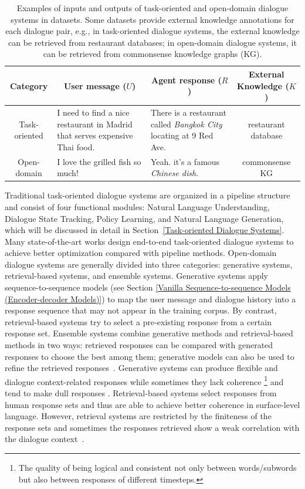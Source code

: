 \begin{table}[h]
\caption{Examples of inputs and outputs of task-oriented and open-domain dialogue systems in datasets. Some datasets provide external knowledge annotations for each dialogue pair, e.g., in task-oriented dialogue systems, the external knowledge can be retrieved from restaurant databases; in open-domain dialogue systems, it can be retrieved from commonsense knowledge graphs (KG).}
\label{An example of inputs and outputs of task-oriented and open-domain dialogue systems in datasets} 
\centering
\begin{tabular}{m{2cm}m{3cm}m{3cm}m{3.7cm}}
\bottomrule
\multicolumn{1}{c}{\textbf{Category}} & \multicolumn{1}{c}{\textbf{User message ($U$)}} & \multicolumn{1}{c}{\textbf{Agent response ($R$)}} & \multicolumn{1}{c}{\textbf{External Knowledge ($K$)}}\\\midrule
\multicolumn{1}{c}{Task-oriented} & I need to find a nice restaurant in Madrid that serves expensive Thai food. & There is a restaurant called \textit{Bangkok City} locating at 9 Red Ave. & \multicolumn{1}{c}{restaurant database} \\\hline
\multicolumn{1}{c}{Open-domain} & I love the grilled fish so much! & Yeah. it's a famous \textit{Chinese dish}. & \multicolumn{1}{c}{commonsense KG} \\
\bottomrule
\end{tabular}
\end{table}
Traditional task-oriented dialogue systems are organized in a pipeline structure and consist of four functional modules: Natural Language Understanding, Dialogue State Tracking, Policy Learning, and Natural Language Generation, which will be discussed in detail in Section~\ref{Task-oriented Dialogue Systems}. Many state-of-the-art works design end-to-end task-oriented dialogue systems to achieve better optimization compared with pipeline methods. Open-domain dialogue systems are generally divided into three categories: generative systems, retrieval-based systems, and ensemble systems. Generative systems apply sequence-to-sequence models (see Section \ref{Vanilla Sequence-to-sequence Models (Encoder-decoder Models)}) to map the user message and dialogue history into a response sequence that may not appear in the training corpus. By contrast, retrieval-based systems try to select a pre-existing response from a certain response set. Ensemble systems combine generative methods and retrieval-based methods in two ways: retrieved responses can be compared with generated responses to choose the best among them; generative models can also be used to refine the retrieved responses~. Generative systems can produce flexible and dialogue context-related responses while sometimes they lack coherence \footnote{The quality of being logical and consistent not only between words/subwords but also between responses of different timesteps.} and tend to make dull responses . Retrieval-based systems select responses from human response sets and thus are able to achieve better coherence in surface-level language. However, retrieval systems are restricted by the finiteness of the response sets and sometimes the responses retrieved show a weak correlation with the dialogue context~. 
